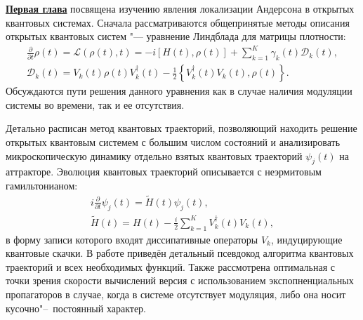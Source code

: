 \underline{\textbf{Первая глава}} посвящена изучению явления локализации Андерсона в открытых квантовых системах.
Сначала рассматриваются общепринятые методы описания открытых квантовых систем "--- уравнение Линдблада для матрицы плотности:
\begin{equation}
\label{eq:GKSL_base}
\begin{gathered}
\frac{\partial}{\partial t} \rho (t) = \mathcal{L}(\rho(t), t) = -i \left[ H(t), \rho(t) \right] + \sum_{k=1}^{K} \gamma_{k}(t) \mathcal{D}_k(t), \\
\mathcal{D}_k(t) =  V_k(t) \rho(t) V_k^\dagger(t) - \frac{1}{2} \left\lbrace V_k^\dagger(t) V_k(t), \rho(t) \right\rbrace.
\end{gathered}
\end{equation}
Обсуждаются пути решения данного уравнения как в случае наличия модуляции системы во времени, так и ее отсутствия.

Детально расписан метод квантовых траекторий, позволяющий находить решение открытых квантовым системем с большим числом состояний и анализировать микроскопическую динамику отдельно взятых квантовых траекторий \(\psi_j(t)\) на аттракторе.
Эволюция квантовых траекторий описывается с неэрмитовым гамильтонианом:
\begin{equation}
\label{eq:schrodinger}
\begin{gathered}
i \frac{\partial}{\partial t} \psi_j(t) = \tilde{H}(t) \psi_j(t), \\
\tilde{H}(t) = H(t) - \frac{i}{2} \sum_{k=1}^{K} V_k^\dagger(t) V_k(t),
\end{gathered}
\end{equation}
в форму записи которого входят диссипативные операторы \(V_k\), индуцирующие квантовые скачки.
В работе приведён детальный псевдокод алгоритма квантовых траекторий и всех необходимых функций. Также рассмотрена оптимальная с точки зрения скорости вычислений версия с использованием экспопненциальных пропагаторов в случае, когда в системе отсутствует модуляция, либо она носит кусочно"--~постоянный характер.

